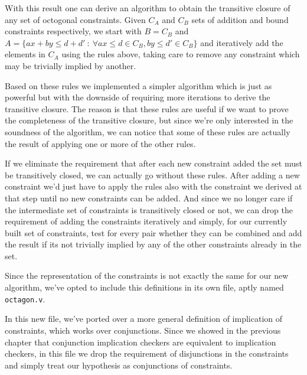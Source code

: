 With this result one can derive an algorithm to obtain the transitive closure of any
set of octogonal constraints. Given $C_A$ and $C_B$ sets of addition and bound 
constraints respectively, we start with $B = C_B$ and 
$A = \{ax + by \le d + d'\ :\  \forall ax\le d\in C_B, by\le d'\in C_B\}$ and 
iteratively add the elements in $C_A$ using the rules above, taking care to remove
any constraint which may be trivially implied by another.

Based on these rules we implemented a simpler algorithm which is just as powerful but
with the downside of requiring more iterations to derive the transitive closure.
The reason is that these rules are useful if we want to prove the completeness of the 
transitive closure, but since we're only interested in the soundness of the algorithm,
we can notice that some of these rules are actually the result of applying one or more
of the other rules.

If we eliminate the requirement that after each new constraint added the set must be 
transitively closed, we can actually go without these rules. After adding a new 
constraint we'd just have to apply the rules also with the constraint we derived at
that step until no new constraints can be added. And since we no longer care if the
intermediate set of constraints is transitively closed or not, we can drop the 
requirement of adding the constraints iteratively and simply, for our currently built
set of constraints, test for every pair whether they can be combined and add the 
result if its not trivially implied by any of the other constraints already in the 
set.

Since the representation of the constraints is not exactly the same for our new 
algorithm, we've opted to include this definitions in its own file, aptly named
\verb|octagon.v|.




In this new file, we've ported over a more general definition of implication of
constraints, which works over conjunctions. Since we showed in the previous chapter
that conjunction implication checkers are equivalent to implication checkers, in this
file we drop the requirement of disjunctions in the constraints and simply treat our
hypothesis as conjunctions of constraints.

